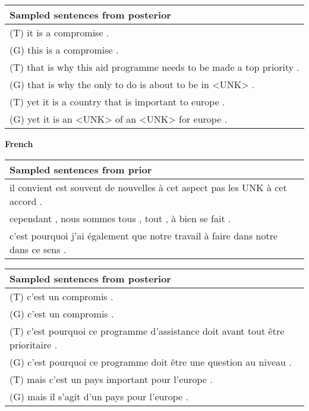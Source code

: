 \begin{center}
  \begin{tabular}{|L{14cm}|} 
    \hline
    Sampled sentences from posterior\\ [0.5ex] 
    \hline\hline
    (T) it is a compromise .\\
    (G) this is a compromise .\\
    \hline
    (T) that is why this aid programme needs to be made a top priority .\\
    (G) that is why the only to do is about to be in <UNK> .\\
    \hline
    (T) yet it is a country that is important to europe .\\
    (G) yet it is an <UNK> of an <UNK> for europe .\\
    \hline
  \end{tabular}
\end{center}

\textbf{French}

\begin{center}
  \begin{tabular}{|L{14cm}|} 
    \hline
    Sampled sentences from prior\\
    \hline\hline
    il convient est souvent de nouvelles à cet aspect pas les UNK à cet accord .\\
    \hline
    cependant , nous sommes tous , tout , à bien se fait .\\
    \hline
    c'est pourquoi j'ai également que notre travail à faire dans notre dans ce sens .\\
    \hline
  \end{tabular}
\end{center}

\begin{center}
  \begin{tabular}{|L{14cm}|} 
    \hline
    Sampled sentences from posterior\\ [0.5ex] 
    \hline\hline
    (T) c’est un compromis .\\
    (G) c’est un compromis .\\
    \hline
    (T) c'est pourquoi ce programme d'assistance doit avant tout être prioritaire .\\
    (G) c'est pourquoi ce programme doit être une question au niveau .\\
    \hline
    (T) mais c'est un pays important pour l'europe .\\
    (G) mais il s'agit d'un pays pour l'europe .\\
    \hline
  \end{tabular}
\end{center}


